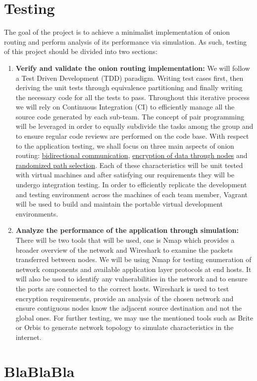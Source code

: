 \documentclass[10pt]{article}
\begin{document}
\section*{Testing}
The goal of the project is to achieve a minimalist implementation of onion
routing and perform analysis of its performance via simulation. As such,
testing of this project should be divided into two sections:
\begin{enumerate}
	\item \textbf{Verify and validate the onion routing implementation:} We
		will follow a Test Driven Development (TDD) paradigm. Writing test
		cases first, then deriving the unit tests through equivalence
		partitioning and finally writing the necessary code for all the tests
		to pass. Throughout this iterative process we will rely on Continuous
		Integration (CI) to efficiently manage all the source code generated by
		each sub-team. The concept of pair programming will be leveraged in
		order to equally subdivide the tasks among the group and to ensure
		regular code reviews are performed on the code base. With respect to
		the application testing, we shall focus on three main aspects of onion
		routing: \underline{bidirectional communication}, \underline{encryption
		of data through nodes} and \underline{randomized path selection}. Each
		of these characteristics will be unit tested with virtual machines and
		after satisfying our requirements they will be undergo integration
		testing. In order to efficiently replicate the development and testing
		environment across the machines of each team member, Vagrant will be
		used to build and maintain the portable virtual development
		environments.
	\item \textbf{Analyze the performance of the application through
		simulation:} There will be two tools that will be used, one is Nmap
		which provides a broader overview of the network and Wireshark to
		examine the packets transferred between nodes. We will be using Nmap
		for testing enumeration of network components and available application
		layer protocols at end hosts. It will also be used to identify any
		vulnerabilities in the network and to ensure the ports are connected to
		the correct hosts. Wireshark is used to test encryption requirements,
		provide an analysis of the chosen network and ensure contiguous nodes
		know the adjacent source destination and not the global ones. For
		further testing, we may use the mentioned tools such as Brite or Orbis
		to generate network topology to simulate characteristics in the
		internet.


\end{enumerate}


\section*{BlaBlaBla}
\end{document}

